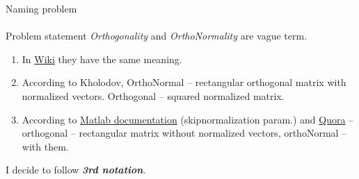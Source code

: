 \documentclass[aspectratio=169]{beamer}
\begin{document}
\begin{frame}[t]{Naming problem}
\framesubtitle{}
\begin{block}{Problem statement}
    \textit{Orthogonality} and \textit{OrthoNormality} are vague term. 
\end{block}    
\begin{enumerate}
    \item In \href{https://en.wikipedia.org/wiki/Orthogonal_matrix}{Wiki} they have the same meaning.
    \item According to Kholodov, OrthoNormal -- rectangular orthogonal matrix with normalized vectors. Orthogonal -- squared normalized matrix.
    \item According to \href{https://se.mathworks.com/help/symbolic/orth.html}{Matlab documentation} (skipnormalization param.) and \href{https://www.quora.com/Does-orthogonal-and-orthonormal-mean-the-same-If-not-what-is-the-difference}{Quora} -- orthogonal -- rectangular matrix without normalized vectors, orthoNormal -- with them.
\end{enumerate}

I decide to follow \textit{\textbf{3rd notation}}.

\end{frame}
\end{document}
